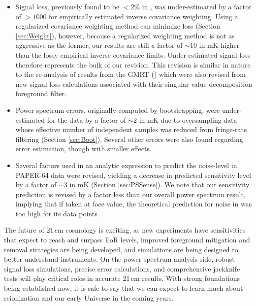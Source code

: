 \documentclass[preprint2,numberedappendix,tighten]{aastex6}  %
\begin{document}
\begin{itemize}
\item Signal loss, previously found to be $<2\%$ in , was under-estimated by a factor of $>$$1000$ for empirically estimated inverse 
covariance weighting. Using a regularized covariance weighting method can minimize loss (Section 
\ref{sec:Weight}), however, because a regularized weighting method is not as aggressive as the former, our results are still a 
factor of $\sim10$ in mK higher than the lossy empirical inverse covariance limits. Under-estimated signal loss therefore represents the bulk of our revision. 
This revision is similar in nature to the re-analysis of results from the GMRT (\citealt{paciga_et_al2013}) which were also 
revised from new signal loss calculations associated with their singular value decomposition foreground filter.
\item Power spectrum errors, originally computed by bootstrapping, were under-estimated for the data by a factor of $\sim2$ in mK due to oversampling data whose effective number of independent samples was reduced from fringe-rate filtering (Section \ref{sec:Boot}). Several other errors were also found regarding error estimation, though with smaller effects.
\item Several factors used in an analytic expression to predict the noise-level in PAPER-64 data were revised, yielding a 
decrease in predicted sensitivity level by a factor of $\sim3$ in mK (Section \ref{sec:PSSense}). We note that our sensitivity prediction is revised by a factor less than our overall
power spectrum result, implying that if taken at face value, the theoretical prediction for noise in  was too high for its data 
points.
\end{itemize}

The future of 21\,cm cosmology is exciting, as new experiments have sensitivities that expect to reach and surpass EoR levels, improved 
foreground mitigation and removal strategies are being developed, and simulations are being designed to better understand 
instruments. On the power spectrum analysis side, robust signal loss simulations, precise error calculations, and 
comprehensive jackknife tests will play critical roles in accurate 21\,cm results. With strong foundations being established now, it is safe to say that we can expect to learn much about reionization and our early Universe in the coming years.


\end{document}
